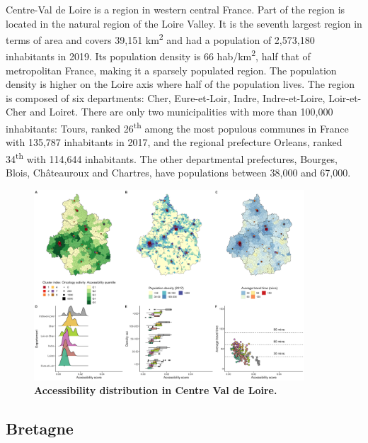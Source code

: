 Centre-Val de Loire is a region in western central France. Part of the region is located in the natural region of the Loire Valley. It is the seventh largest region in terms of area and covers 39,151 km\textsuperscript{2} and had a population of 2,573,180 inhabitants in 2019. Its population density is 66 hab/km\textsuperscript{2}, half that of metropolitan France, making it a sparsely populated region. The population density is higher on the Loire axis where half of the population lives. The region is composed of six departments: Cher, Eure-et-Loir, Indre, Indre-et-Loire, Loir-et-Cher and Loiret. There are only two municipalities with more than 100,000 inhabitants: Tours, ranked 26\textsuperscript{th} among the most populous communes in France with 135,787 inhabitants in 2017, and the regional prefecture Orleans, ranked 34\textsuperscript{th} with 114,644 inhabitants. The other departmental prefectures, Bourges, Blois, Châteauroux and Chartres, have populations between 38,000 and 67,000.

\begin{figure}[H]
    \includegraphics[width=0.9\textwidth]{images/camion/region_accessibility/accessibility_Centre-Val-de-Loire.png}
    \centering
    \caption{
        \textbf{Accessibility distribution in Centre Val de Loire.}
    }
\end{figure}

\subsection*{Bretagne}

